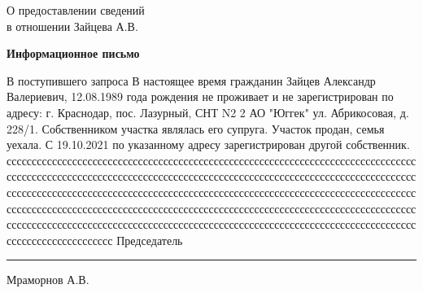 \begin{flushleft}
	\vspace{10mm}
О предоставлении сведений\\
в отношении Зайцева  А.В.
\end{flushleft}
\vspace{7mm}
\begin{center}
	\Large\textbf{Информационное письмо}
\end{center}
\par

В поступившего запроса В настоящее время гражданин Зайцев Александр Валериевич, 12.08.1989 года рождения не проживает и не зарегистрирован по адресу:  г. Краснодар, пос. Лазурный, СНТ N2 2 АО "Юггек" ул. Абрикосовая, д. 228/1.  Собственником участка являлась его супруга. Участок продан, семья уехала. С 19.10.2021   по указанному адресу зарегистрирован другой собственник. 
сссссссссссссссссссссссссссссссссссссссссссссссссссссссссссссссссссссссссссссссссссссссссссссссссссссссссссссссссссссссссссссссссссссссссссссссссссссссссссссссссссссссссссссссссссссссссссссссссссссссссссссссссссссссссссссссссссссссссссссссссссссссссссссссссссссссссссссссссссссссссссссссссссссссссссссссссссссссссссссссссссссссссссссссссссссссссссссссссссссссссссссссссссссссссссссссссссссссссссссссссссссссссссссссссссссссссс
\vspace{35mm}
Председатель \hfill    \rule{4cm}{0.1 mm}    Мраморнов А.В.




